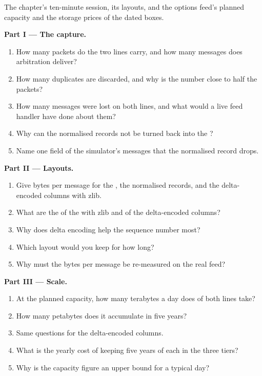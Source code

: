 \begin{problem}\label{pb:pl:capturing-and-storing-tick-data:1}
The chapter's ten-minute session, its layouts, and the options feed's planned capacity and the storage prices of the dated
boxes.

\medskip\noindent\textbf{Part I --- The capture.}
\begin{enumerate}
\item How many packets do the two lines carry, and how many messages does arbitration deliver?
\item How many duplicates are discarded, and why is the number close to half the packets?
\item How many messages were lost on both lines, and what would a live feed handler have done about them?
\item Why can the normalised records not be turned back into the ?
\item Name one field of the simulator's messages that the normalised record drops.
\end{enumerate}

\medskip\noindent\textbf{Part II --- Layouts.}
\begin{enumerate}[resume]
\item Give bytes per message for the , the normalised records, and the delta-encoded columns with zlib.
\item What are the  of the  with zlib and of the delta-encoded columns?
\item Why does delta encoding help the sequence number most?
\item Which layout would you keep for how long?
\item Why must the bytes per message be re-measured on the real feed?
\end{enumerate}

\medskip\noindent\textbf{Part III --- Scale.}
\begin{enumerate}[resume]
\item At the planned capacity, how many terabytes a day does  of both lines take?
\item How many petabytes does it accumulate in five years?
\item Same questions for the delta-encoded columns.
\item What is the yearly cost of keeping five years of each in the three tiers?
\item Why is the capacity figure an upper bound for a typical day?
\end{enumerate}


\end{problem}

